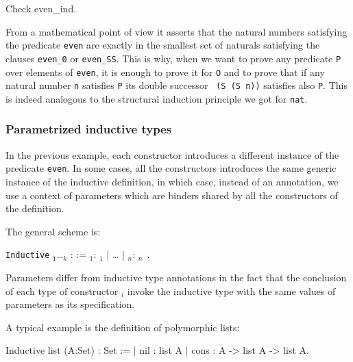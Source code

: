 \begin{coq_example}
Check even_ind.
\end{coq_example}

From a mathematical point of view it asserts that the natural numbers
satisfying the predicate {\tt even} are exactly in the smallest set of
naturals satisfying the clauses {\tt even\_0} or {\tt even\_SS}. This
is why, when we want to prove any predicate {\tt P} over elements of
{\tt even}, it is enough to prove it for {\tt O} and to prove that if
any natural number {\tt n} satisfies {\tt P} its double successor {\tt
  (S (S n))} satisfies also {\tt P}. This is indeed analogous to the
structural induction principle we got for {\tt nat}.

\begin{ErrMsgs}
\item {}
\item {}
\end{ErrMsgs}

\subsubsection{Parametrized inductive types}
In the previous example, each constructor introduces a
different instance of the predicate {\tt even}. In some cases, 
all the constructors introduces the same generic instance of the
inductive definition, in which case, instead of an annotation, we use
a context of parameters which are binders shared by all the
constructors of the definition.


The general scheme is:
\begin{center}
{\tt Inductive} {\ident} {\binder$_1$}\ldots{\binder$_k$} : {\term} :=
    {\ident$_1$}: {\term$_1$} | {\ldots} | {\ident$_n$}: \term$_n$
{\tt .}
\end{center}
Parameters differ from inductive type annotations in the fact that the
conclusion of each type of constructor {\term$_i$} invoke the inductive
type with the same values of parameters as its specification.



A typical example is the definition of polymorphic lists:
\begin{coq_example*}
Inductive list (A:Set) : Set :=
  | nil : list A
  | cons : A -> list A -> list A.
\end{coq_example*}

